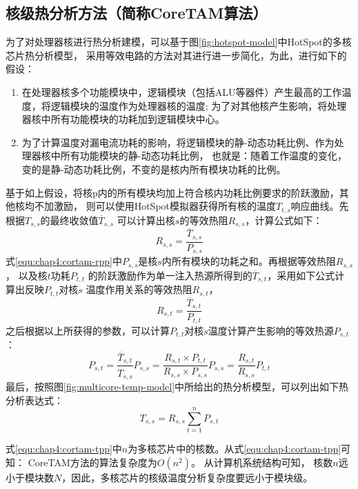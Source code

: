 \subsection{核级热分析方法（简称CoreTAM算法）}
为了对处理器核进行热分析建模，可以基于图\ref{fig:hotspot-model}中HotSpot的多核芯片热分析模型， 采用等效电路的方法对其进行进一步简化，为此，进行如下的假设：
\begin{enumerate}[1)]
\item 在处理器核多个功能模块中，逻辑模块（包括ALU等器件）产生最高的工作温度，将逻辑模块的温度作为处理器核的温度; 为了对其他核产生影响，将处理器核中所有功能模块的功耗加到逻辑模块中心。
\item 为了计算温度对漏电流功耗的影响，将逻辑模块的静-动态功耗比例、作为处理器核中所有功能模块的静-动态功耗比例， 也就是：随着工作温度的变化，变的是静-动态功耗比例，不变的是核内所有模块功耗的比例。
\end{enumerate}

基于如上假设，将核p内的所有模块均加上符合核内功耗比例要求的阶跃激励，其他核均不加激励， 则可以使用HotSpot模拟器获得所有核的温度$T_{t,s}$响应曲线。先根据$T_{s,s}$的最终收敛值$\overline{T}_{s,s}$ 可以计算出核$s$的等效热阻$R_{s,s}$，计算公式如下：
\begin{equation}
\label{equ:chap4:cortam-rpp}
R_{s,s} = \frac{\overline{T}_{s,s}}{P_{s,s}}
\end{equation}
式\ref{equ:chap4:cortam-rpp}中$P_{s,s}$是核$s$内所有模块的功耗之和。再根据等效热阻$R_{s,s}$， 以及核$t$功耗$P_{t,t}$ 的阶跃激励作为单一注入热源所得到的$\overline{T}_{s,t}$，采用如下公式计算出反映$P_{t,t}$对核$s$ 温度作用关系的等效热阻$R_{s,t}$，
\begin{equation}
\label{equ:chap4:cortam-rpq}
R_{s,t} = \frac{\overline{T}_{s,t}}{P_{t,t}}
\end{equation}
之后根据以上所获得的参数，可以计算$P_{t,t}$对核$s$温度计算产生影响的等效热源$P_{s,t}$：
\begin{equation}
\label{equ:chap4:cortam-ppq}
P_{s,t} = \frac{\overline{T}_{s,t}}{\overline{T}_{s,s}}P_{s,s} = \frac{R_{s,t}\times P_{t,t}}{R_{s,s}\times P_{s,s}}P_{s,s} = \frac{R_{s,t}}{R_{s,s}}P_{t,t}
\end{equation}
最后，按照图\ref{fig:multicore-temp-model}中所给出的热分析模型，可以列出如下热分析表达式：
\begin{equation}
\label{equ:chap4:cortam-tpp}
T_{s,s} = R_{s,s}\sum\limits_{t=1}^n P_{s,t}
\end{equation}

式\ref{equ:chap4:cortam-tpp}中$n$为多核芯片中的核数。从式\ref{equ:chap4:cortam-tpp}可知： CoreTAM方法的算法复杂度为$O(n^2)$。 从计算机系统结构可知， 核数$n$远小于模块数$N$，因此，多核芯片的核级温度分析复杂度要远小于模块级。

